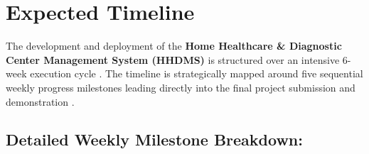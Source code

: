 \documentclass[lettersize,onecolumn,journal]{IEEEtran}
\begin{document}
	\section{Expected Timeline}
	
	The development and deployment of the \textbf{Home Healthcare \& Diagnostic Center Management System (HHDMS)} is structured over an intensive 6-week execution cycle \cite{srs2026}. The timeline is strategically mapped around five sequential weekly progress milestones leading directly into the final project submission and demonstration \cite{srs2026}.
	
	\subsection*{\textbf{Detailed Weekly Milestone Breakdown:}}
	
\end{document}
